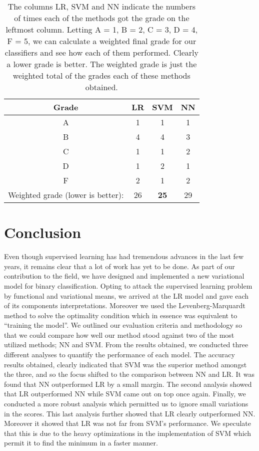 \documentclass{INGUADY}
\begin{document}
\begin{body}
\begin{table*}
\center
\caption{The columns LR, SVM and NN indicate the numbers of times each of the methods got the grade on the leftmost column. Letting A = 1, B = 2, C = 3, D = 4, F = 5, we can calculate a weighted final grade for our classifiers and see how each of them performed. Clearly a lower grade is better. The weighted grade is just the weighted total of the grades each of these methods obtained.}
\vspace{3mm}
\setlength{\tabcolsep}{2mm}
\begin{tabular}{c|ccc}
\toprule
Grade & LR & SVM & NN \\
\midrule
A & 1 & 1 & 1\\
B & 4 & 4 & 3 \\
C & 1 & 1 & 2 \\
D & 1 & 2 & 1 \\
F & 2 & 1 & 2 \\
\midrule
Weighted grade (lower is better): & 26 & \textbf{25} & 29\\
\bottomrule
\end{tabular}
\label{tab:grades}
\end{table*}
\section{Conclusion}
Even though supervised learning has had tremendous advances in the last few years, it remains clear that a lot of work has yet to be done. 
As part of our contribution to the field, we have designed and implemented a new variational model for binary classification. Opting to attack the supervised learning problem by functional and variational means, we arrived at the LR model and gave each of its components interpretations. Moreover we used the Levenberg-Marquardt method to solve the optimality condition which in essence was equivalent to ``training the model''. We outlined our evaluation  criteria and methodology so that we could compare how well our method stood against two of the most utilized methods; NN and SVM.  From the results obtained, we conducted three different analyses to quantify the performance of each model. The accuracy results obtained, clearly indicated that SVM was the superior method amongst the three, and so the focus shifted to the comparison between NN and LR. It was found that NN outperformed LR by a small margin. The second analysis showed that LR outperformed NN while SVM came out on top once again. Finally, we conducted a more robust analysis which permitted us to ignore small variations in the scores. This last analysis further showed that LR clearly outperformed NN. Moreover it showed that LR was not far from SVM's performance. We speculate that this is due to the heavy optimizations in the implementation of SVM which permit it to find the minimum in a faster manner.


\end{body}
\end{document}
